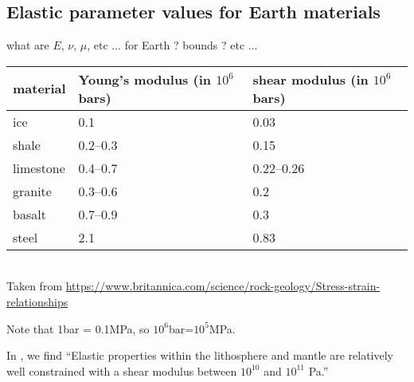 \newpage
\subsection{Elastic parameter values for Earth materials}


what are $E$, $\nu$, $\mu$, etc ... for Earth ? bounds ? etc ...

\begin{center}
\begin{tabular}{lll}
\hline
material & Young's modulus (in $10^6$ bars) &	shear modulus (in $10^6$ bars)  \\
\hline\hline
ice &	0.1 &	0.03\\
shale &	0.2–0.3 	& 0.15\\
limestone &	0.4–0.7 &	0.22–0.26\\
granite &	0.3–0.6 &	0.2\\
basalt &	0.7–0.9 &	0.3\\
steel &	2.1 &	0.83 \\
\hline
\end{tabular}\\
{\captionfont Taken from 
\url{https://www.britannica.com/science/rock-geology/Stress-strain-relationships}}
\end{center}

Note that 1bar = 0.1MPa, so $10^6$bar=$10^5$MPa.

In \textcite{famc14}, we find ``Elastic properties within the lithosphere and mantle are relatively well constrained with a shear modulus between $10^{10}$ and $10^{11}$ Pa.''

